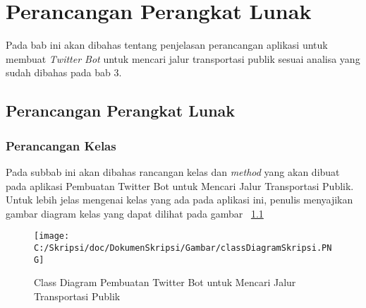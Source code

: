 \chapter{Perancangan Perangkat Lunak}
\label{chap:perancangan perangkat lunak}

Pada bab ini akan dibahas tentang penjelasan perancangan aplikasi untuk membuat \textit{Twitter Bot} untuk mencari jalur transportasi publik sesuai analisa yang sudah dibahas pada bab 3.

\section{Perancangan Perangkat Lunak}

\subsection{Perancangan Kelas}
Pada subbab ini akan dibahas rancangan kelas dan \textit{method} yang akan dibuat pada aplikasi Pembuatan Twitter Bot untuk Mencari Jalur Transportasi Publik. Untuk lebih jelas mengenai kelas yang ada pada aplikasi ini, penulis menyajikan gambar diagram kelas yang dapat dilihat pada gambar ~\ref{fig:classDiagramSkripsi}

\begin{figure}[htbp]
	\centering
		\texttt{[image: C:/Skripsi/doc/DokumenSkripsi/Gambar/classDiagramSkripsi.PNG]}
	\caption{Class Diagram Pembuatan Twitter Bot untuk Mencari Jalur Transportasi Publik}
	\label{fig:classDiagramSkripsi}
\end{figure}



